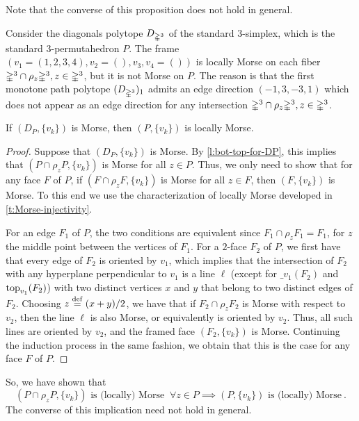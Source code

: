 Note that the converse of this proposition does not hold in general.

\begin{example}
\label{e:simplex-permuto}
	Consider the diagonals polytope $D_{\mathbb{\Delta}^3}$ of the standard $3$-simplex, which is the standard $3$-permutahedron $P$.
	The frame $(v_1=(1,2,3,4),v_2=(),v_3, v_4=())$ is locally Morse on each fiber $\mathbb{\Delta}^3 \cap \rho_z \mathbb{\Delta}^3, z \in \mathbb{\Delta}^3$, but it is not Morse on $P$.
	The reason is that the first monotone path polytope $(D_{\mathbb{\Delta}^3})_1$ admits an edge direction $(-1,3,-3,1)$ which does not appear as an edge direction for any intersection $\mathbb{\Delta}^3 \cap \rho_z \mathbb{\Delta}^3, z \in \mathbb{\Delta}^3$.
\end{example}

\begin{theorem}
	If $(D_P,\{v_k\})$ is Morse, then $(P,\{v_k\})$ is locally Morse.
\end{theorem}

\begin{proof}
	Suppose that $(D_P,\{v_k\})$ is Morse.
	By \cref{l:bot-top-for-DP}, this implies that $(P\cap\rho_z P, \{v_k\})$ is Morse for all $z \in P$.
	Thus, we only need to show that for any face $F$ of $P$, if $(F \cap \rho_z F, \{v_k\})$ is Morse for all $z \in F$, then $(F,\{v_k\})$ is Morse.
	To this end we use the characterization of locally Morse developed in \cref{t:Morse-injectivity}.

	For an edge $F_1$ of $P$, the two conditions are equivalent since $F_1 \cap \rho_z F_1 = F_1$, for $z$ the middle point between the vertices of $F_1$.
	For a $2$-face $F_2$ of $P$, we first have that every edge of $F_2$ is oriented by $v_1$, which implies that the intersection of $F_2$ with any hyperplane perpendicular to $v_1$ is a line $\ell$ (except for $\bm_{v_1}(F_2)$ and $\operatorname{top}_{v_1}(F_2)$) with two distinct vertices $x$ and $y$ that belong to two distinct edges of $F_2$.
	Choosing $z \stackrel{\mathrm{def}}{=} (x+y)/2$, we have that if $F_2 \cap \rho_z F_2$ is Morse with respect to $v_2$, then the line $\ell$ is also Morse, or equivalently is oriented by $v_2$.
	Thus, all such lines are oriented by $v_2$, and the framed face $(F_2,\{v_k\})$ is Morse.
	Continuing the induction process in the same fashion, we obtain that this is the case for any face $F$ of $P$.
\end{proof}

So, we have shown that
\[
	(P\cap \rho_z P,\{v_k\}) \text{ is (locally) Morse }  \ \forall z \in P
	\implies (P,\{v_k\}) \text{ is (locally) Morse} \ .
\]
The converse of this implication need not hold in general.

